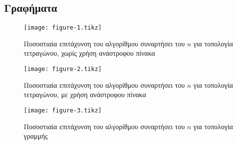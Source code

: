 \documentclass[11pt,a4paper,titlepage]{article}
\newlength\figureheight
\newlength\figurewidth
\begin{document}
\subsection{Γραφήματα}
	\setlength\figureheight{3.87cm}
	\setlength\figurewidth{14.7cm}

	\begin{figure}[h!]
		\centering
		\texttt{[image: figure-1.tikz]}
		\caption{Ποσοστιαία επιτάχυνση του αλγορίθμου συναρτήσει του $n$ για τοπολογία τετραγώνου, χωρίς χρήση ανάστροφου πίνακα}
		\label{fig:p1}
	\end{figure}
	\begin{figure}[h!]
		\centering
		\texttt{[image: figure-2.tikz]}
		\caption{Ποσοστιαία επιτάχυνση του αλγορίθμου συναρτήσει του $n$ για τοπολογία τετραγώνου, με χρήση ανάστροφου πίνακα}
		\label{fig:p2}
	\end{figure}
	\begin{figure}[h!]
		\centering
		\texttt{[image: figure-3.tikz]}
		\caption{Ποσοστιαία επιτάχυνση του αλγορίθμου συναρτήσει του $n$ για τοπολογία γραμμής}
		\label{fig:p3}
	\end{figure}
\end{document}
